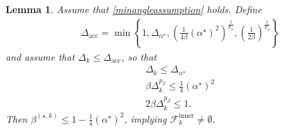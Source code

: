 \documentclass{article}
\newtheorem{lemma}[theorem]{Lemma}
\theoremstyle{case}
\newcommand{\dacc}{{\Delta_{\text{acc}}}}
\newcommand{\dk}{\Delta_k}
\newcommand{\bsk}{{\beta^{(\star, k)}}}
\newcommand{\fcki}{{\mathcal {F}^{\text{inner}}_k}}
\newcommand{\minangledelta}{{\Delta_{\alpha^{\star}}}}
\newcommand{\minanglealpha}{{ \alpha^{\star} }}
\begin{document}
\begin{lemma}
\label{boundbeta}
Assume that \cref{minangleassumption} holds.
Define
\begin{align}
\dacc =\min\left\{
1,
\minangledelta,
\left(\frac 1 {4\beta} \left(\minanglealpha\right)^2\right)^{\frac 1 {p_{\beta}}},
\left(\frac 1 {2\beta}\right)^{\frac 1 {p_{\beta}}}
\right\}\label{define_boundedbeta_deltasmall}
\end{align}
and assume that $\dk \le \dacc$, so that
\begin{align}
\dk \le \minangledelta \label{boundedbeta_deltasmall_1} \\
\beta\dk^{p_{\beta}} \le \frac 1 {4} \left(\minanglealpha\right)^2 \label{boundedbeta_deltasmall_2} \\
2\beta\dk^{p_{\beta}} \le 1. \label{boundedbeta_deltasmall_3}
\end{align}
Then $\bsk \le 1 - \frac 1 4 (\minanglealpha)^2$, implying $\fcki \ne \emptyset$.
\end{lemma}
\end{document}
